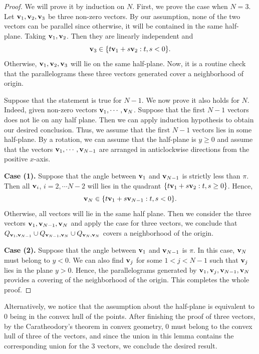 \documentclass[12pt,a4paper,oneside]{amsart}
\theoremstyle{definition}
\newcounter{rem}
\begin{document}
\begin{proof}
We will prove it by induction on $N$. First, we prove the case when $N=3$. Let ${\bf v}_1,{\bf v}_2,{\bf v}_3$ be three non-zero vectors. By our assumption, none of the two vectors can be parallel since otherwise, it will be contained in the same half-plane. Taking ${\bf v}_1,{\bf v}_2$. Then they are linearly independent and 
$$
{\bf v}_3 \in \{t{\bf v}_1+s{\bf v}_2: t,s<0\}.
$$
Otherwise, ${\bf v}_1,{\bf v}_2,{\bf v}_3$ will lie on the same half-plane. Now, it is a routine check that the parallelograms these three vectors generated cover a neighborhood of origin. 

\medskip

Suppose that the statement is true for $N-1$. We now prove it also holds for $N$. Indeed, given non-zero vectors  ${\bf v}_1,\cdots,{\bf v}_N$. Suppose that the first $N-1$ vectors does not lie on any half plane. Then we can apply induction hypothesis to obtain our desired conclusion. Thus, we assume that the first $N-1$ vectors lies in some half-plane. By a rotation, we can assume that the half-plane is $y\ge 0$ and assume that the vectors ${\bf v}_1,\cdots,{\bf v}_{N-1}$ are arranged in anticlockwise directions from the positive $x$-axis.

{\bf Case (1).} Suppose that the angle between ${\bf v}_1$ and ${\bf v}_{N-1}$ is strictly less than $\pi$. Then all ${\bf v}_{i}$,  $i=2,\cdots N-2$ will lies in the quadrant $\{t{\bf v}_1+s{\bf v}_2: t,s\ge 0\}$. Hence, 
$$
{\bf v}_N \in \{t{\bf v}_1+s{\bf v}_{N-1}: t,s<0\}.
$$
Otherwise, all vectors will lie in the same half plane. Then we consider the three vectors ${\bf v}_1,{\bf v}_{N-1},{\bf v}_N$ and apply the case for three vectors, we conclude that $Q_{{\bf v}_1,{\bf v}_{N-1}}\cup Q_{{\bf v}_{N-1},{\bf v}_{N}}\cup  Q_{{\bf v}_{N},{\bf v}_{N}}$ covers a neighborhood of the origin. 

{\bf Case (2).} Suppose that the angle between ${\bf v}_1$ and ${\bf v}_{N-1}$ is  $\pi$. In this case, ${\bf v}_N$ must belong to $y<0$. We can also find ${\bf v}_j$ for some $1<j<N-1$ such that ${\bf v}_j$ lies in the plane $y>0$. Hence, the parallelograms generated by ${\bf v}_1,{\bf v}_j,{\bf v}_{N-1}, {\bf v}_N$ provides a covering of the neighborhood of the origin. This completes the whole proof.

\end{proof}

{Alternatively, we notice that the assumption about the half-plane is equivalent to 0 being in the convex hull of the points. After finishing the proof of three vectors, by the {Caratheodory's theorem} in convex geometry, 0 must belong to the convex hull of three of the vectors, and since the union in this lemma contains the corresponding union for the 3 vectors, we conclude the desired result.}
\end{document}
